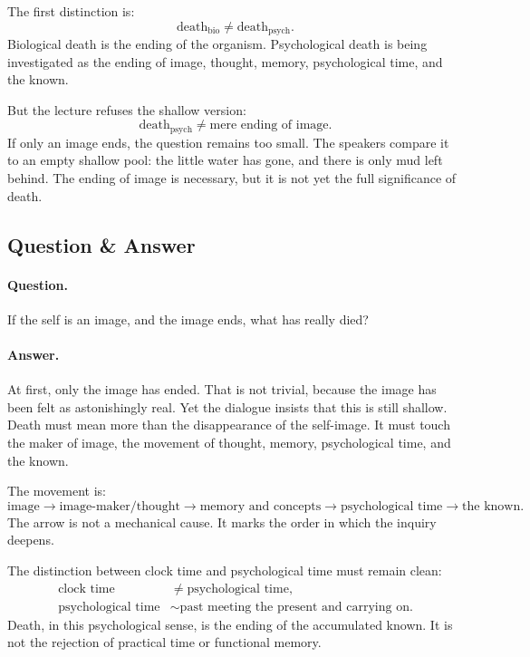 \documentclass[11pt,oneside]{book}
\begin{document}
The first distinction is:
\begin{equation}
\text{death}_{\mathrm{bio}}
\neq
\text{death}_{\mathrm{psych}}.
\end{equation}
Biological death is the ending of the organism. Psychological death is being investigated as the ending of image, thought, memory, psychological time, and the known.

But the lecture refuses the shallow version:
\begin{equation}
\text{death}_{\mathrm{psych}}
\neq
\text{mere ending of image}.
\end{equation}
If only an image ends, the question remains too small. The speakers compare it to an empty shallow pool: the little water has gone, and there is only mud left behind. The ending of image is necessary, but it is not yet the full significance of death.

\subsection{Question \& Answer}

\paragraph{Question.}
If the self is an image, and the image ends, what has really died?

\paragraph{Answer.}
At first, only the image has ended. That is not trivial, because the image has been felt as astonishingly real. Yet the dialogue insists that this is still shallow. Death must mean more than the disappearance of the self-image. It must touch the maker of image, the movement of thought, memory, psychological time, and the known.

The movement is:
\begin{equation}
\text{image}
\longrightarrow
\text{image-maker/thought}
\longrightarrow
\text{memory and concepts}
\longrightarrow
\text{psychological time}
\longrightarrow
\text{the known}.
\end{equation}
The arrow is not a mechanical cause. It marks the order in which the inquiry deepens.

The distinction between clock time and psychological time must remain clean:
\begin{align}
\text{clock time} &\neq \text{psychological time},\\
\text{psychological time} &\sim \text{past meeting the present and carrying on}.
\end{align}
Death, in this psychological sense, is the ending of the accumulated known. It is not the rejection of practical time or functional memory.
\end{document}
